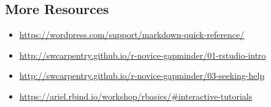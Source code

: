 \documentclass[
]{article}
\providecommand{\tightlist}{%
  \setlength{\itemsep}{0pt}\setlength{\parskip}{0pt}}
\begin{document}
\hypertarget{more-resources}{%
\subsection{More Resources}\label{more-resources}}

\begin{itemize}
\tightlist
\item
  \url{https://wordpress.com/support/markdown-quick-reference/}
\item
  \url{http://swcarpentry.github.io/r-novice-gapminder/01-rstudio-intro}
\item
  \url{http://swcarpentry.github.io/r-novice-gapminder/03-seeking-help}
\item
  \url{https://ariel.rbind.io/workshop/rbasics/\#interactive-tutorials}
\end{itemize}
\end{document}
